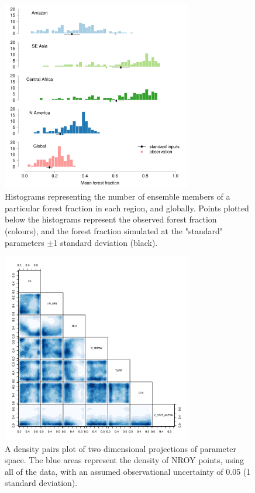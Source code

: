 \documentclass[esd, article]{copernicus} %
\begin{document}
\begin{figure}[t]
\includegraphics[width=8.3cm]{graphics/fraction_histogram_with_discrepancy_standard.pdf}
\caption{Histograms representing the number of ensemble members of a particular forest fraction in each region, and globally. Points plotted below the histograms represent the observed forest fraction (colours), and the forest fraction simulated at the "standard" parameters $\pm$1 standard deviation (black).}
\label{fig:fraction_histogram_with_discrepancy_standard}
\end{figure}

\begin{figure}[t]
\includegraphics[width=8.3cm]{graphics/credible_NROY.pdf}
\caption{A density pairs plot of two dimensional projections of parameter space. The blue areas represent the density of NROY points, using all of the data, with an assumed observational uncertainty of 0.05 (1 standard deviation).}
\label{fig:credible_NROY}
\end{figure}
\end{document}
